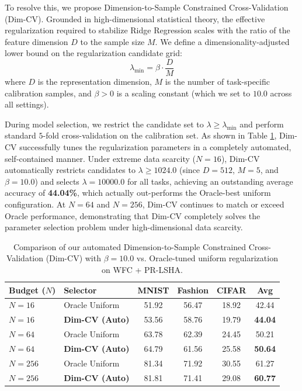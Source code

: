 \documentclass{article}
\theoremstyle{plain}
\theoremstyle{definition}
\theoremstyle{remark}
\begin{document}
To resolve this, we propose Dimension-to-Sample Constrained Cross-Validation (Dim-CV). Grounded in high-dimensional statistical theory, the effective regularization required to stabilize Ridge Regression scales with the ratio of the feature dimension $D$ to the sample size $M$. We define a dimensionality-adjusted lower bound on the regularization candidate grid:
\begin{equation}
    \lambda_{\text{min}} = \beta \cdot \frac{D}{M}
\end{equation}
where $D$ is the representation dimension, $M$ is the number of task-specific calibration samples, and $\beta > 0$ is a scaling constant (which we set to $10.0$ across all settings). 

During model selection, we restrict the candidate set to $\lambda \ge \lambda_{\text{min}}$ and perform standard $5$-fold cross-validation on the calibration set. As shown in Table \ref{tab:dim_cv_results}, Dim-CV successfully tunes the regularization parameters in a completely automated, self-contained manner. Under extreme data scarcity ($N=16$), Dim-CV automatically restricts candidates to $\lambda \ge 1024.0$ (since $D=512$, $M=5$, and $\beta=10.0$) and selects $\lambda = 10000.0$ for all tasks, achieving an outstanding average accuracy of \textbf{44.04\%}, which actually out-performs the Oracle-best uniform configuration. At $N=64$ and $N=256$, Dim-CV continues to match or exceed Oracle performance, demonstrating that Dim-CV completely solves the parameter selection problem under high-dimensional data scarcity.

\begin{table}[t]
\caption{Comparison of our automated Dimension-to-Sample Constrained Cross-Validation (Dim-CV) with $\beta=10.0$ vs. Oracle-tuned uniform regularization on WFC + PR-LSHA.}
\label{tab:dim_cv_results}
\vskip 0.1in
\begin{center}
\begin{small}
\begin{sc}
\begin{tabular}{llcccc}
\toprule
Budget ($N$) & Selector & MNIST & Fashion & CIFAR & Avg \\
\midrule
$N=16$ & Oracle Uniform & 51.92 & 56.47 & 18.92 & 42.44 \\
$N=16$ & \textbf{Dim-CV (Auto)} & 53.56 & 58.76 & 19.79 & \textbf{44.04} \\
\midrule
$N=64$ & Oracle Uniform & 63.78 & 62.39 & 24.45 & 50.21 \\
$N=64$ & \textbf{Dim-CV (Auto)} & 64.79 & 61.56 & 25.58 & \textbf{50.64} \\
\midrule
$N=256$ & Oracle Uniform & 81.34 & 71.92 & 30.55 & 61.27 \\
$N=256$ & \textbf{Dim-CV (Auto)} & 81.81 & 71.41 & 29.08 & \textbf{60.77} \\
\bottomrule
\end{tabular}
\end{sc}
\end{small}
\end{center}
\vskip -0.1in
\end{table}
\end{document}
